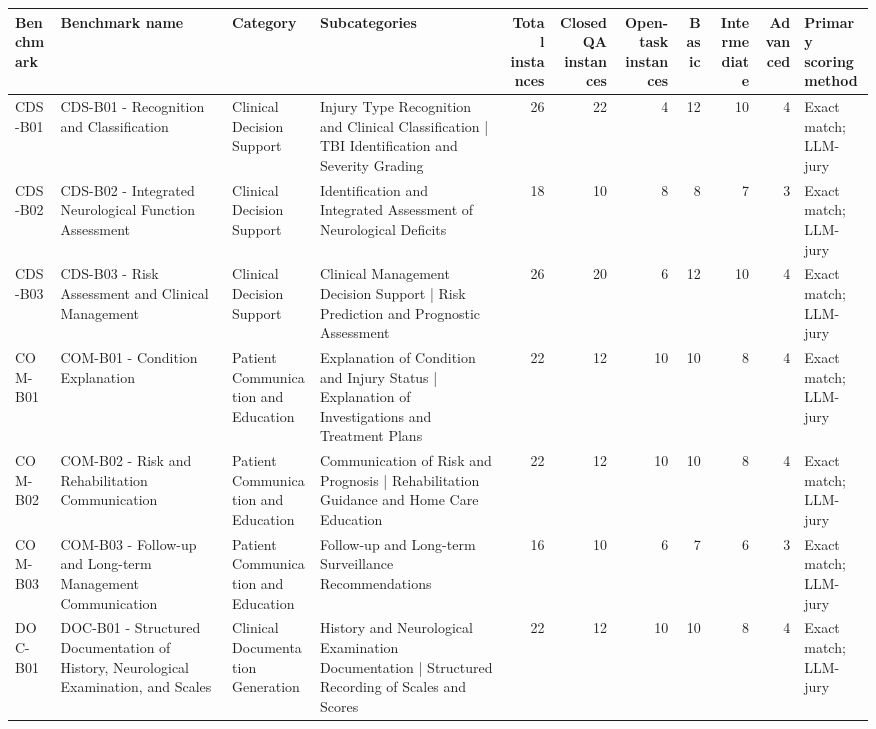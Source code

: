 \begin{tabular}{llllrrrrrrl}
\toprule
Benchmark & Benchmark name & Category & Subcategories & Total instances & Closed QA instances & Open-task instances & Basic & Intermediate & Advanced & Primary scoring method \\
\midrule
CDS-B01 & CDS-B01 - Recognition and Classification & Clinical Decision Support & Injury Type Recognition and Clinical Classification | TBI Identification and Severity Grading & 26 & 22 & 4 & 12 & 10 & 4 & Exact match; LLM-jury \\
CDS-B02 & CDS-B02 - Integrated Neurological Function Assessment & Clinical Decision Support & Identification and Integrated Assessment of Neurological Deficits & 18 & 10 & 8 & 8 & 7 & 3 & Exact match; LLM-jury \\
CDS-B03 & CDS-B03 - Risk Assessment and Clinical Management & Clinical Decision Support & Clinical Management Decision Support | Risk Prediction and Prognostic Assessment & 26 & 20 & 6 & 12 & 10 & 4 & Exact match; LLM-jury \\
COM-B01 & COM-B01 - Condition Explanation & Patient Communication and Education & Explanation of Condition and Injury Status | Explanation of Investigations and Treatment Plans & 22 & 12 & 10 & 10 & 8 & 4 & Exact match; LLM-jury \\
COM-B02 & COM-B02 - Risk and Rehabilitation Communication & Patient Communication and Education & Communication of Risk and Prognosis | Rehabilitation Guidance and Home Care Education & 22 & 12 & 10 & 10 & 8 & 4 & Exact match; LLM-jury \\
COM-B03 & COM-B03 - Follow-up and Long-term Management Communication & Patient Communication and Education & Follow-up and Long-term Surveillance Recommendations & 16 & 10 & 6 & 7 & 6 & 3 & Exact match; LLM-jury \\
DOC-B01 & DOC-B01 - Structured Documentation of History, Neurological Examination, and Scales & Clinical Documentation Generation & History and Neurological Examination Documentation | Structured Recording of Scales and Scores & 22 & 12 & 10 & 10 & 8 & 4 & Exact match; LLM-jury \\

\end{tabular}
